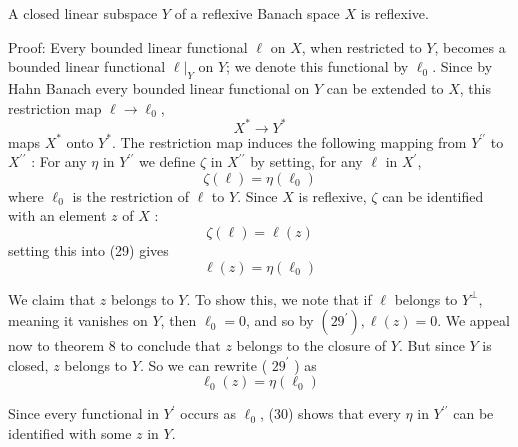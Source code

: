 \documentclass[12pt, oneside]{book}
\begin{document}
\begin{theorem}
    A closed linear subspace $Y$ of a reflexive Banach space $X$ is reflexive.

    Proof:
    Every bounded linear functional $\ell$ on $X$, when restricted to $Y$, becomes a bounded linear functional $\ell|_Y$ on $Y$; we denote this functional by $\ell_0$. Since by Hahn Banach every bounded linear functional on $Y$ can be extended to $X$, this restriction map $\ell \rightarrow \ell_0$,
    \begin{equation*}
        X^* \longrightarrow Y^*
    \end{equation*}
    maps $X^*$ onto $Y^*$. The restriction map induces the following mapping from $Y^{\prime \prime}$ to $X^{\prime \prime}$ : For any $\eta$ in $Y^{\prime \prime}$ we define $\zeta$ in $X^{\prime \prime}$ by setting, for any $\ell$ in $X^{\prime}$,
    \begin{equation*}
        \zeta(\ell)=\eta\left(\ell_0\right)
    \end{equation*}
    where $\ell_0$ is the restriction of $\ell$ to $Y$. Since $X$ is reflexive, $\zeta$ can be identified with an element $z$ of $X$ :
    \begin{equation*}
        \zeta(\ell)=\ell(z)
    \end{equation*}
    setting this into (29) gives
    \begin{equation*}
        \ell(z)=\eta\left(\ell_0\right)
    \end{equation*}

    We claim that $z$ belongs to $Y$. To show this, we note that if $\ell$ belongs to $Y^{\perp}$, meaning it vanishes on $Y$, then $\ell_0=0$, and so by $\left(29^{\prime}\right), \ell(z)=0$. We appeal now to theorem 8 to conclude that $z$ belongs to the closure of $Y$. But since $Y$ is closed, $z$ belongs to $Y$. So we can rewrite ( $29^{\prime}$ ) as
    \begin{equation*}
        \ell_0(z)=\eta\left(\ell_0\right)
    \end{equation*}

    Since every functional in $Y^{\prime}$ occurs as $\ell_0$, (30) shows that every $\eta$ in $Y^{\prime \prime}$ can be identified with some $z$ in $Y$.
\end{theorem}
\end{document}
